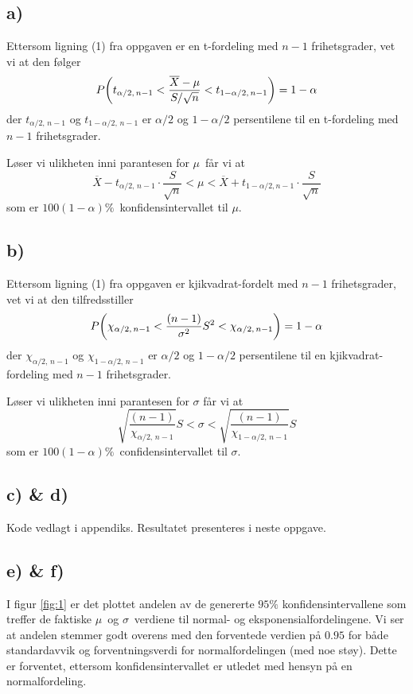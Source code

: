 \documentclass[12p,a4paper]{article}
\renewcommand{\bar}{\overline}
\begin{document}
\subsection*{a)}
Ettersom ligning (1) fra oppgaven er en t-fordeling med $n-1$ frihetsgrader, vet vi at den følger
\begin{equation}
    P\qty(t_{\alpha/2,\, n-1} < \frac{\bar{X} - \mu}{S/\sqrt{n}} < t_{1-\alpha/2,\, n-1}) = 1-\alpha
\end{equation}
der $t_{\alpha/2,\, n-1}$ og $t_{1-\alpha/2,\, n-1}$ er $\alpha/2$ og $1-\alpha/2$ persentilene til en t-fordeling med $n-1$ frihetsgrader. 

Løser vi ulikheten inni parantesen for $\mu$ får vi at
\begin{equation*}
    \bar{X} - t_{\alpha/2,\, n-1}\cdot\frac{S}{\sqrt{n}} < \mu < \bar{X} + t_{1 - \alpha/2, n-1}\cdot\frac{S}{\sqrt{n}}
\end{equation*}
som er $100(1-\alpha)\%$ konfidensintervallet til $\mu$.



\subsection*{b)}
Ettersom ligning (1) fra oppgaven er kjikvadrat-fordelt med $n-1$ frihetsgrader, vet vi at den tilfredsstiller
\begin{equation}
    P\qty(\chi_{\alpha/2,\, n-1} < \frac{(n-1)}{\sigma^2}S^2 < \chi_{\alpha/2,\, n-1}) = 1 - \alpha
\end{equation}
der $\chi_{\alpha/2,\, n-1}$ og $\chi_{1-\alpha/2,\, n-1}$ er $\alpha/2$ og $1-\alpha/2$ persentilene til en kjikvadrat-fordeling med $n-1$ frihetsgrader. 

Løser vi ulikheten inni parantesen for $\sigma$ får vi at
\begin{equation}
    \sqrt{\frac{(n-1)}{\chi_{\alpha/2,\, n-1}}}S < \sigma < \sqrt{\frac{(n-1)}{\chi_{1-\alpha/2,\, n-1}}}S
\end{equation}
som er $100(1-\alpha)\%$ confidensintervallet til $\sigma$.



\subsection*{c) \& d)}
Kode vedlagt i appendiks. Resultatet presenteres i neste oppgave.



\subsection*{e) \& f)}
I figur \ref{fig:1} er det plottet andelen av de genererte $95\%$ konfidensintervallene som treffer de faktiske $\mu$ og $\sigma$ verdiene til normal- og eksponensialfordelingene. Vi ser at andelen stemmer godt overens med den forventede verdien på $0.95$ for både standardavvik og forventningsverdi for normalfordelingen (med noe støy). Dette er forventet, ettersom konfidensintervallet er utledet med hensyn på en normalfordeling.
\end{document}
